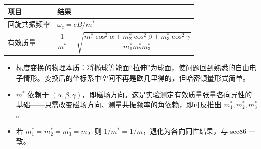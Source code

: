 \begin{formulabox}[答案汇总]
\begin{center}
\begin{tabular}{ll}
\toprule
\textbf{项目} & \textbf{结果} \\
\midrule
回旋共振频率 & $\omega_c=eB/m^*$ \\
有效质量 & $\dfrac{1}{m^*}=\sqrt{\dfrac{m_1^*\cos^2\alpha+m_2^*\cos^2\beta+m_3^*\cos^2\gamma}{m_1^*m_2^*m_3^*}}$ \\
\bottomrule
\end{tabular}
\end{center}
\end{formulabox}

\begin{insightbox}[物理图像]
\begin{itemize}
    \item 标度变换的物理本质：将椭球等能面``拉伸''为球面，使问题回到熟悉的自由电子情形。变换后的坐标系中空间不再是欧几里得的，但哈密顿量形式简单。
    \item $m^*$ 依赖于 $(\alpha,\beta,\gamma)$，即磁场方向。这是实验测定有效质量张量各向异性的基础——只需改变磁场方向、测量共振频率的角依赖，即可反推出 $m_1^*,m_2^*,m_3^*$。
    \item 若 $m_1^*=m_2^*=m_3^*=m$，则 $1/m^*=1/m$，退化为各向同性结果，与 sec86 一致。
\end{itemize}
\end{insightbox}
